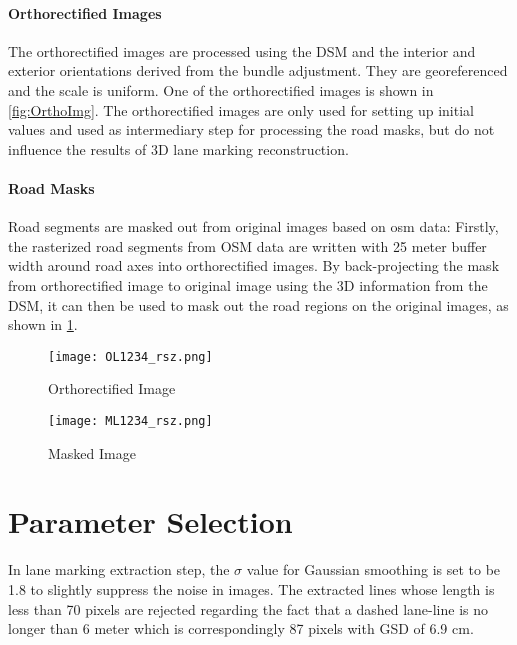 \clearpage
\paragraph{Orthorectified Images}
The orthorectified images are processed using the DSM and the interior and exterior orientations derived from the bundle adjustment. They are georeferenced and the scale is uniform. One of the orthorectified images is shown in \cref{fig:OrthoImg}. The orthorectified images are only used for setting up initial values and used as intermediary step for processing the road masks, but do not influence the results of 3D lane marking reconstruction.

\paragraph{Road Masks}
Road segments are masked out from original images based on \gls{osm} data: Firstly, the rasterized road segments from OSM data are written with 25 meter buffer width around road axes into orthorectified images. By back-projecting the mask from orthorectified image to original image using the 3D information from the DSM, it can then be used to mask out the road regions on the original images, as shown in \cref{fig:MaskedImg}.

\begin{figure}%
	\centering
    	\texttt{[image: OL1234\_rsz.png]}
    	\caption{\small Orthorectified Image}
    	\label{fig:OrthoImg}
	\vspace{1cm}
		\texttt{[image: ML1234\_rsz.png]}
		\caption{\small Masked Image}
		\label{fig:MaskedImg}
\end{figure}

\clearpage
\section{Parameter Selection}
\label{sec:ParameterSelection}

In lane marking extraction step, the $\sigma$ value for Gaussian smoothing is set to be 1.8 %
to slightly suppress the noise in images.
The extracted lines whose length is less than 70 pixels are rejected %
regarding the fact that a dashed lane-line is no longer than 6 meter which is correspondingly 87 pixels with GSD of 6.9 cm.



